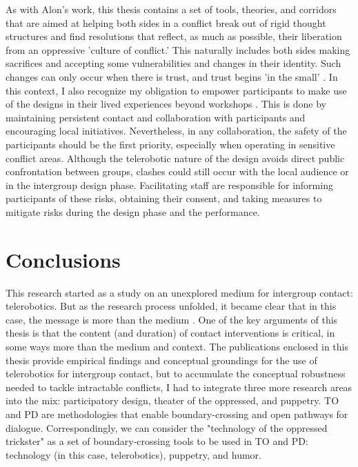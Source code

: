 \documentclass[dissertation,math,vertlayout,pdfa,colorlinks]{aaltoseries}
\begin{document}
As with Alon's work, this thesis contains a set of tools, theories, and corridors that are aimed at helping both sides in a conflict break out of rigid thought structures and find resolutions that reflect, as much as possible, their liberation from an oppressive 'culture of conflict.' This naturally includes both sides making sacrifices and accepting some vulnerabilities and changes in their identity. Such changes can only occur when there is trust, and trust begins 'in the small' \cite{bodkerAfterthoughtsEmergentFuture2025, manziniDesignWhenEverybody2015}. In this context, I also recognize my obligation to empower participants to make use of the designs in their lived experiences beyond workshops \cite{geppertDesignEquivalenceAgonism2022}. This is done by maintaining persistent contact and collaboration with participants and encouraging local initiatives. Nevertheless, in any collaboration, the safety of the participants should be the first priority, especially when operating in sensitive conflict areas. Although the telerobotic nature of the design avoids direct public confrontation between groups, clashes could still occur with the local audience or in the intergroup design phase. Facilitating staff are responsible for informing participants of these risks, obtaining their consent, and taking measures to mitigate risks during the design phase and the performance.



\chapter{Conclusions}
This research started as a study on an unexplored medium for intergroup contact: telerobotics. But as the research process unfolded, it became clear that in this case, the message is more than the medium \cite{mcluhanUnderstandingMediaExtensions1994}. One of the key arguments of this thesis is that the content (and duration) of contact interventions is critical, in some ways more than the medium and context. The publications enclosed in this thesis provide empirical findings and conceptual groundings for the use of telerobotics for intergroup contact, but to accumulate the conceptual robustness needed to tackle intractable conflicts, I had to integrate three more research areas into the mix: participatory design, theater of the oppressed, and puppetry. TO and PD are methodologies that enable boundary-crossing and open pathways for dialogue. Correspondingly, we can consider the "technology of the oppressed trickster" as a set of boundary-crossing tools to be used in TO and PD: technology (in this case, telerobotics), puppetry, and humor.
\end{document}
